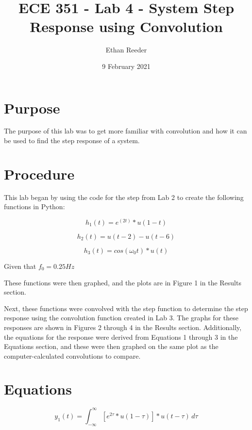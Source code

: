 \documentclass[12pt]{article}
\title{ECE 351 - Lab 4 - System Step Response using Convolution}
\author{Ethan Reeder}
\date{9 February 2021}
\begin{document}
\lstset{language=Python}

\maketitle

\newpage

\tableofcontents

\newpage

\section{Purpose}

The purpose of this lab was to get more familiar with convolution and how it can be used to find the step response of a system.

\section{Procedure}
This lab began by using the code for the step from Lab 2 to create the following functions in Python:

\begin{equation}
    h_1(t) = e^(2t) * u(1-t)
\end{equation}

\begin{equation}
    h_2(t) = u(t-2) - u(t-6)
\end{equation}

\begin{equation}
    h_3(t) = cos(\omega_0 t) * u(t)
\end{equation}

Given that $f_0 = 0.25 Hz$

These functions were then graphed, and the plots are in Figure 1 in the Results section.

Next, these functions were convolved with the step function to determine the step response using the convolution function created in Lab 3. The graphs for these responses are shown in Figures 2 through 4 in the Results section. Additionally, the equations for the response were derived from Equations 1 through 3 in the Equations section, and these were then graphed on the same plot as the computer-calculated convolutions to compare.

\section{Equations}

\begin{equation}
    y_1(t) = \int_{-\infty}^{\infty} [e^{2\tau} * u(1-\tau)] * u(t-\tau) \, d\tau
\end{equation}
\end{document}
